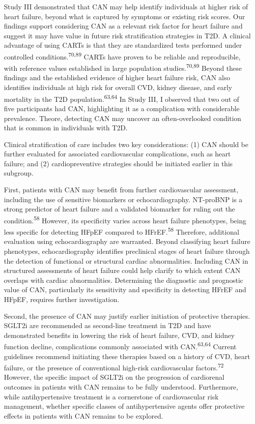 \documentclass[
  letterpaper,
  headsepline=true,
  open=any]{scrbook}
\begin{document}
Study III demonstrated that CAN may help identify individuals at higher
risk of heart failure, beyond what is captured by symptoms or existing
risk scores. Our findings support considering CAN as a relevant risk
factor for heart failure and suggest it may have value in future risk
stratification strategies in T2D. A clinical advantage of using CARTs is
that they are standardized tests performed under controlled
conditions.\textsuperscript{70,89} CARTs have proven to be reliable and
reproducible, with reference values established in large population
studies.\textsuperscript{70,89} Beyond these findings and the
established evidence of higher heart failure risk, CAN also identifies
individuals at high risk for overall CVD, kidney disease, and early
mortality in the T2D population.\textsuperscript{63,64} In Study III, I
observed that two out of five participants had CAN, highlighting it as a
complication with considerable prevalence. Theore, detecting CAN may
uncover an often-overlooked condition that is common in individuals with
T2D.

Clinical stratification of care includes two key considerations: (1) CAN
should be further evaluated for associated cardiovascular complications,
such as heart failure; and (2) cardiopreventive strategies should be
initiated earlier in this subgroup.

First, patients with CAN may benefit from further cardiovascular
assessment, including the use of sensitive biomarkers or
echocardiography. NT-proBNP is a strong predictor of heart failure and a
validated biomarker for ruling out the condition.\textsuperscript{58}
However, its specificity varies across heart failure phenotypes, being
less specific for detecting HFpEF compared to HFrEF.\textsuperscript{58}
Therefore, additional evaluation using echocardiography are warranted.
Beyond classifying heart failure phenotypes, echocardiography identifies
preclinical stages of heart failure through the detection of functional
or structural cardiac abnormalities. Including CAN in structured
assessments of heart failure could help clarify to which extent CAN
overlaps with cardiac abnormalities. Determining the diagnostic and
prognostic value of CAN, particularly its sensitivity and specificity in
detecting HFrEF and HFpEF, requires further investigation.

Second, the presence of CAN may justify earlier initiation of protective
therapies. SGLT2i are recommended as second-line treatment in T2D and
have demonstrated benefits in lowering the risk of heart failure, CVD,
and kidney function decline, complications commonly associated with
CAN.\textsuperscript{63,64} Current guidelines recommend initiating
these therapies based on a history of CVD, heart failure, or the
presence of conventional high-risk cardiovascular
factors.\textsuperscript{72} However, the specific impact of SGLT2i on
the progression of cardiorenal outcomes in patients with CAN remains to
be fully understood. Furthermore, while antihypertensive treatment is a
cornerstone of cardiovascular risk management, whether specific classes
of antihypertensive agents offer protective effects in patients with CAN
remains to be explored.
\end{document}
